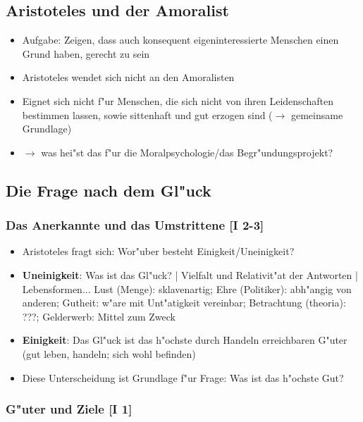 \documentclass[emulatestandardclasses]{scrartcl}
\begin{document}
\subsection{Aristoteles und der Amoralist}

\begin{itemize}
  \item Aufgabe: Zeigen, dass auch konsequent eigeninteressierte Menschen einen Grund haben, gerecht zu sein
  \item Aristoteles wendet sich nicht an den Amoralisten
  \item Eignet sich nicht f"ur Menschen, die sich nicht von ihren Leidenschaften bestimmen lassen, sowie sittenhaft und gut erzogen sind ($\rightarrow$ gemeinsame Grundlage)
  \item $\rightarrow$ was hei"st das f"ur die Moralpsychologie/das Begr"undungsprojekt?
\end{itemize}

\subsection{Die Frage nach dem Gl"uck}

\subsubsection{Das Anerkannte und das Umstrittene [I 2-3]}

\begin{itemize}
  \item Aristoteles fragt sich: Wor"uber besteht Einigkeit/Uneinigkeit?
  \item \textbf{Uneinigkeit}: Was ist das Gl"uck? | Vielfalt und Relativit"at der Antworten | Lebensformen... Lust (Menge): sklavenartig; Ehre (Politiker): abh"angig von anderen; Gutheit: w"are mit Unt"atigkeit vereinbar; Betrachtung (theoria): ???; Gelderwerb: Mittel zum Zweck
  \item \textbf{Einigkeit}: Das Gl"uck ist das h"ochste durch Handeln erreichbaren G"uter (gut leben, handeln; sich wohl befinden)
  \item Diese Unterscheidung ist Grundlage f"ur Frage: Was ist das h"ochste Gut?
\end{itemize}

\subsubsection{G"uter und Ziele [I 1]}
\end{document}
